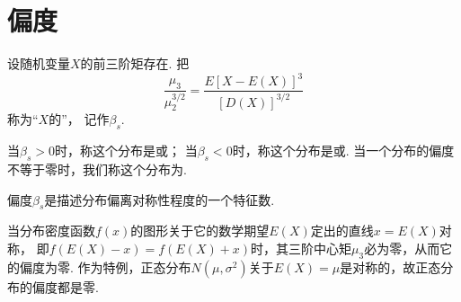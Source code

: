 \section{偏度}
\begin{definition}
设随机变量\(X\)的前三阶矩存在.
把\[
	\frac{\mu_3}{\mu_2^{3/2}}
	=\frac{E[X-E(X)]^3}{[D(X)]^{3/2}}
\]称为“\(X\)的”，
记作\(\beta_s\).

当\(\beta_s>0\)时，称这个分布是或；
当\(\beta_s<0\)时，称这个分布是或.
当一个分布的偏度不等于零时，我们称这个分布为.
\end{definition}

偏度\(\beta_s\)是描述分布偏离对称性程度的一个特征数.

当分布密度函数\(f(x)\)的图形关于它的数学期望\(E(X)\)定出的直线\(x=E(X)\)对称，
即\(f(E(X)-x)=f(E(X)+x)\)时，其三阶中心矩\(\mu_3\)必为零，从而它的偏度为零.
作为特例，正态分布\(N(\mu,\sigma^2)\)关于\(E(X)=\mu\)是对称的，故正态分布的偏度都是零.
